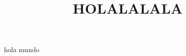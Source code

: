 \documentclass[
  letterpaper,
  DIV=11,
  numbers=noendperiod]{scrartcl}
\title{HOLALALALA}
\author{}
\date{}
\begin{document}
\maketitle


hola mundo
\end{document}
